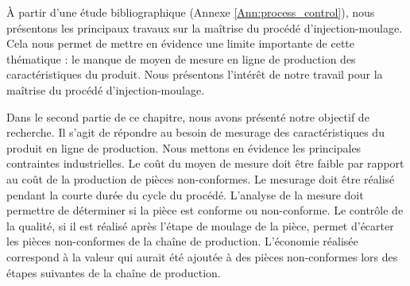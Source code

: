 

À partir d'une étude bibliographique (Annexe \ref{Ann:process_control}), nous présentons les principaux travaux sur la maîtrise du procédé d'injection-moulage.
Cela nous permet de mettre en évidence une limite importante de cette thématique : le manque de moyen de mesure en ligne de production des caractéristiques du produit.
Nous présentons l'intérêt de notre travail pour la maîtrise du procédé d'injection-moulage.

\smallskip

Dans le second partie de ce chapitre, nous avons présenté notre objectif de recherche.
Il s'agit de répondre au besoin de mesurage des caractéristiques du produit en ligne de production.
Nous mettons en évidence les principales contraintes industrielles.
Le coût du moyen de mesure doit être faible par rapport au coût de la production de pièces non-conformes.
Le mesurage doit être réalisé pendant la courte durée du cycle du procédé.
L'analyse de la mesure doit permettre de déterminer si la pièce est conforme ou non-conforme.
Le contrôle de la qualité, si il est réalisé après l'étape de moulage de la pièce, permet d'écarter les pièces non-conformes de la chaîne de production.
L'économie réalisée correspond à la valeur qui aurait été ajoutée à des pièces non-conformes lors des étapes suivantes de la chaîne de production.

